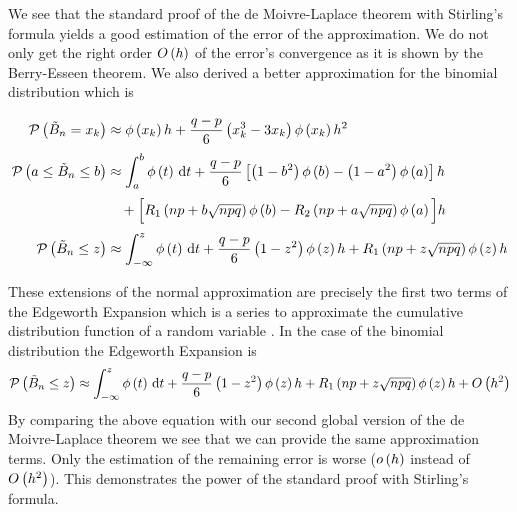 We see that the standard proof of the de Moivre-Laplace theorem with Stirling's formula yields a good estimation of the error of the approximation. We do not only get the right order $O\left( {h} \right)$ of the error's convergence as it is shown by the Berry-Esseen theorem. We also derived a better approximation for the binomial distribution which is

\begin{align}
  \P{\BBs = \x}& \approx \fphi{\x} h +\frac{q-p}6 \left(\x^3-3\x\right) \fphi{\x} h^2 \nl
  \P{a \le \BBs \le b} & \approx  \int_a^b \fphi{t} \d{t} + \frac{q-p}6 \left[\br{1-b^2}\fphi{b}-\br{1-a^2}\fphi{a}\right] h \nonumber \nl
  & \quad +\Big[\Ro{np + b\sqrt{npq}}\fphi{b} - \Rt{np + a \sqrt{npq}}\fphi{a}\Big]h \nl
  \P{\BBs \le z} & \approx \int_{-\infty}^z \fphi{t} \d{t} + \frac{q-p}6 \br{1-z^2}\fphi{z} h + \Ro{np+z\sqrt{npq}} \fphi{z} h 
\end{align}

These extensions of the normal approximation are precisely the first two terms of the Edgeworth Expansion  which is a series to approximate the cumulative distribution function of a random variable \cite[pp. 39 ff.]{hall}\cite{wiki:edgeworth}. In the case of the binomial distribution the Edgeworth Expansion is \cite[p. 46]{hall}
\begin{align}
  \mathcal P\left({\tilde B_{n} \le z}\right) \approx \int_{-\infty}^z \phi\left( {t} \right) \,\mathrm d{t} + \frac{q-p}6 \left( {1-z^2} \right)\phi\left( {z} \right) h + R_1\left({np + z \sqrt{npq}}\right)\phi\left( {z} \right)h + O\left( {h^2} \right)
\end{align}
By comparing the above equation with our second global version of the de Moivre-Laplace theorem we see that we can provide the same approximation terms. Only the estimation of the remaining error is worse ($o\left( {h} \right)$ instead of $O\left( {h^2} \right)$). This demonstrates the power of the standard proof with Stirling's formula.



